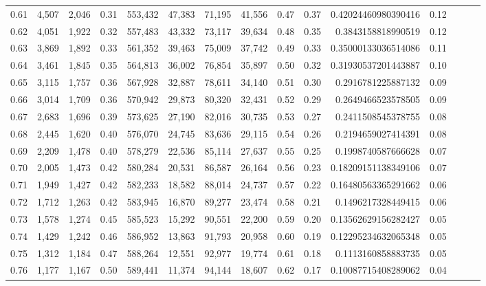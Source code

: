 \begin{tabular}{rrrrrrrrrrrrrrr}
0.61 &   4,507 &  2,046 &  0.31 &  553,432 &   47,383 &   71,195 &   41,556 &  0.47 &  0.37 &   0.42024460980390416 &      0.12 \\
0.62 &   4,051 &  1,922 &  0.32 &  557,483 &   43,332 &   73,117 &   39,634 &  0.48 &  0.35 &    0.3843158818990519 &      0.12 \\
0.63 &   3,869 &  1,892 &  0.33 &  561,352 &   39,463 &   75,009 &   37,742 &  0.49 &  0.33 &   0.35000133036514086 &      0.11 \\
0.64 &   3,461 &  1,845 &  0.35 &  564,813 &   36,002 &   76,854 &   35,897 &  0.50 &  0.32 &   0.31930537201443887 &      0.10 \\
0.65 &   3,115 &  1,757 &  0.36 &  567,928 &   32,887 &   78,611 &   34,140 &  0.51 &  0.30 &    0.2916781225887132 &      0.09 \\
0.66 &   3,014 &  1,709 &  0.36 &  570,942 &   29,873 &   80,320 &   32,431 &  0.52 &  0.29 &    0.2649466523578505 &      0.09 \\
0.67 &   2,683 &  1,696 &  0.39 &  573,625 &   27,190 &   82,016 &   30,735 &  0.53 &  0.27 &    0.2411508545378755 &      0.08 \\
0.68 &   2,445 &  1,620 &  0.40 &  576,070 &   24,745 &   83,636 &   29,115 &  0.54 &  0.26 &    0.2194659027414391 &      0.08 \\
0.69 &   2,209 &  1,478 &  0.40 &  578,279 &   22,536 &   85,114 &   27,637 &  0.55 &  0.25 &    0.1998740587666628 &      0.07 \\
0.70 &   2,005 &  1,473 &  0.42 &  580,284 &   20,531 &   86,587 &   26,164 &  0.56 &  0.23 &   0.18209151138349106 &      0.07 \\
0.71 &   1,949 &  1,427 &  0.42 &  582,233 &   18,582 &   88,014 &   24,737 &  0.57 &  0.22 &   0.16480563365291662 &      0.06 \\
0.72 &   1,712 &  1,263 &  0.42 &  583,945 &   16,870 &   89,277 &   23,474 &  0.58 &  0.21 &    0.1496217328449415 &      0.06 \\
0.73 &   1,578 &  1,274 &  0.45 &  585,523 &   15,292 &   90,551 &   22,200 &  0.59 &  0.20 &   0.13562629156282427 &      0.05 \\
0.74 &   1,429 &  1,242 &  0.46 &  586,952 &   13,863 &   91,793 &   20,958 &  0.60 &  0.19 &   0.12295234632065348 &      0.05 \\
0.75 &   1,312 &  1,184 &  0.47 &  588,264 &   12,551 &   92,977 &   19,774 &  0.61 &  0.18 &    0.1113160858883735 &      0.05 \\
0.76 &   1,177 &  1,167 &  0.50 &  589,441 &   11,374 &   94,144 &   18,607 &  0.62 &  0.17 &   0.10087715408289062 &      0.04 \\

\end{tabular}
